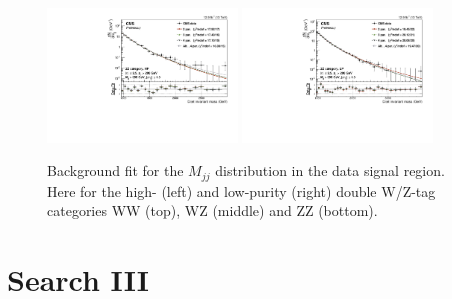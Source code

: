 \begin{figure}[h!]
\includegraphics[width=0.45\textwidth]{figures/analysis/search2/AN-16-235/plots/ZZHP.pdf}
\includegraphics[width=0.45\textwidth]{figures/analysis/search2/AN-16-235/plots/ZZLP.pdf}
\caption{Background fit for the $M_{jj}$ distribution in the data signal region. Here for the high- (left) and low-purity (right) double W/Z-tag categories WW (top), WZ (middle) and ZZ (bottom).}
\label{fig:bkgfit_sr_vv}
\end{figure}



\clearpage
\chapter{Search III}
\vspace*{\fill}\newpage
\label{app:search3}
